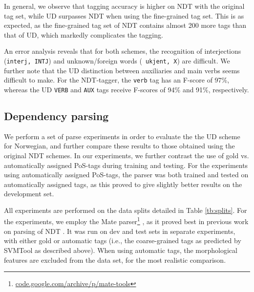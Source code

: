 \documentclass[10pt, a4paper]{article}
\begin{document}
In general, we observe that tagging accuracy is higher on NDT with the
original tag set, while UD surpasses NDT when using the fine-grained
tag set. This is as expected, as the fine-grained tag set of NDT
contains almost 200 more tags than that of UD, which markedly
complicates the tagging.

An error analysis reveals that for both schemes, the recognition of
interjections ({\tt interj, INTJ}) and unknown/foreign words ({\tt
  ukjent, X}) are difficult. We further note that the UD distinction
between auxiliaries and main verbs seems difficult to make. For the
NDT-tagger, the {\tt verb} tag has an F-score of 97\%, whereas the UD
{\tt VERB} and {\tt AUX} tags receive F-scores of 94\% and 91\%,
respectively.


\subsection{Dependency parsing}
We perform a set of parse experiments in order to evaluate the the UD
scheme for Norwegian, and further compare these results to those
obtained using the original NDT schemes. In our experiments, we
further contrast the use of gold vs. automatically assigned PoS-tags
during training and testing. For the experiments using automatically
assigned PoS-tags, the parser was both trained and tested on
automatically assigned tags, as this proved to give slightly better
results on the development set.

All experiments are performed on the data splits detailed in Table
\ref{tb:splits}. For the experiments, we employ the Mate
parser\footnote{\url{code.google.com/archive/p/mate-tools}}
\cite{Boh:10}, as it proved best in previous work on parsing of NDT
\cite{Sol:Skj:Ovr:14}. It was run on dev and test sets in separate
experiments, with either gold or automatic tags (i.e., the
coarse-grained tags as predicted by SVMTool as described above).  When
using automatic tags, the morphological features are excluded from the
data set, for the most realistic comparison.
\end{document}
